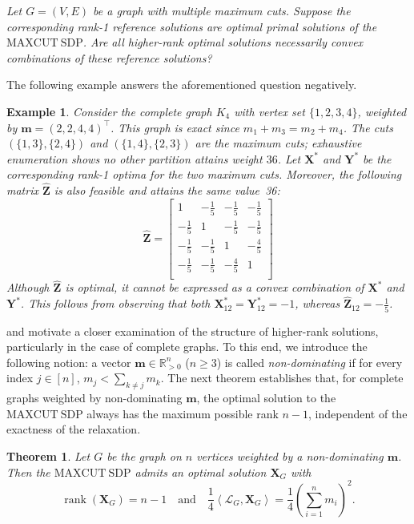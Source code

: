 \documentclass[a4paper,fleqn]{cas-sc}
\newcommand{\X}{\mathbf{X}}
\renewcommand{\L}{\mathcal{L}}
\newcommand{\1}{\mathbf{1}}
\newcommand{\Y}{\mathbf{Y}}
\newcommand{\bZ}{\mathbf{Z}}
\newcommand{\bm}{\mathbf{m}}
\newtheorem{example}{Example}
\newtheorem{theorem}{Theorem}
\begin{document}
\textit{Let \( G = (V, E) \) be a graph with multiple maximum cuts. Suppose the corresponding rank-1 reference solutions are optimal primal solutions of the $\mathrm{MAXCUT\ SDP}$. Are all higher-rank optimal solutions necessarily convex combinations of these reference solutions?}\vspace{1mm}

The following example answers the aforementioned question negatively.
\begin{example} \label{counter2}
Consider the complete graph \(K_4\) with vertex set \(\{1,2,3,4\}\), weighted by \(\mathbf{m}=(2,2,4,4)^{\top}\). This graph is exact since $m_1 + m_3 = m_2 + m_4$. The cuts \((\{1,3\},\{2,4\})\) and \((\{1,4\},\{2,3\})\) are the maximum cuts; exhaustive enumeration shows no other partition attains weight \(36\). Let \(\X^*\) and \(\Y^*\) be the corresponding rank-1 optima for the two maximum cuts. Moreover, the following matrix \(\mathbf{\hat{Z}}\) is also feasible and attains the same value~36:
\[
\hat{\bZ} = \begin{bmatrix}
1 & -\frac{1}{5} & -\frac{1}{5} & -\frac{1}{5}  \\[2mm]
-\frac{1}{5} & 1 & -\frac{1}{5} & -\frac{1}{5}  \\[2mm]
-\frac{1}{5} & -\frac{1}{5} & 1 & -\frac{4}{5}  \\[2mm]
-\frac{1}{5} & -\frac{1}{5} & -\frac{4}{5} & 1 \\
\end{bmatrix}
\]
Although \(\hat{\bZ}\) is optimal, it cannot be expressed as a convex combination of \(\X^*\) and \(\Y^*\). This follows from observing that both \( \X^*_{12} = \Y^*_{12} = -1 \), whereas \( \hat{\bZ}_{12} = -\frac{1}{5} \). 
\end{example}

 and  motivate a closer examination of the structure of higher-rank solutions, particularly in the case of complete graphs. To this end, we introduce the following notion: a vector \(\mathbf{m} \in\mathbb{R}^n_{>0}\) (\(n\ge 3\)) is called \emph{non-dominating} if for every index \(j \in [n]\), $m_j<\sum_{k\ne j} m_k$. The next theorem establishes that, for complete graphs weighted by non-dominating $\mathbf{m}$, the optimal solution to the $\mathrm{MAXCUT \ SDP}$ always has the maximum possible rank $n-1$, independent of the exactness of the relaxation. 
\begin{theorem}\label{thm:3}
Let $G$ be the graph on $n$ vertices weighted by a non-dominating $\bm$. 
Then the $\mathrm{MAXCUT\ SDP}$ admits an optimal solution $\X_G$ with 
\[
\operatorname{rank}(\X_G)=n-1
\quad\text{and}\quad
\dfrac14 \left \langle \L_G, \X_G \right \rangle  =\dfrac14 \left(\sum_{i=1}^n m_i\right)^2.
\]
\end{theorem}
\end{document}
